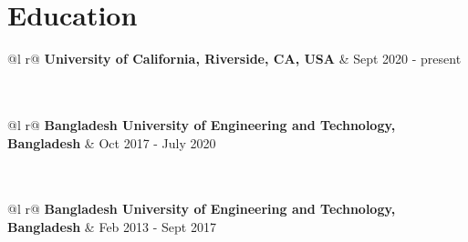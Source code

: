 \documentclass[a4paper,7 pt]{article}
\begin{document}


\section{Education}

\begin{tabularx}{\linewidth}{ @{}l r@{} }
\textbf{University of California, Riverside, CA, USA} & \hfill Sept 2020 - present \\[3.75pt]
\\

 \\
\end{tabularx}

\begin{tabularx}{\linewidth}{ @{}l r@{} }
\textbf{Bangladesh University of Engineering and Technology, Bangladesh} & \hfill Oct 2017 - July 2020 \\[3.75pt]
\\
 \\
\end{tabularx}


\begin{tabularx}{\linewidth}{ @{}l r@{} }
\textbf{Bangladesh University of Engineering and Technology, Bangladesh} & \hfill Feb 2013 - Sept 2017 \\[3.75pt]
\\
 \\

\end{tabularx}
\end{document}
